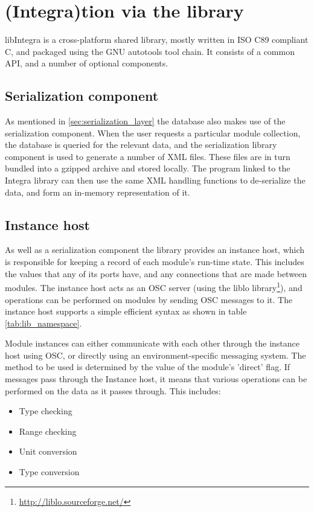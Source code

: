 \section{(Integra)tion via the library}\label{subsec:db_lib}

libIntegra is a cross-platform shared library, mostly written in ISO
C89 compliant C, and packaged using the GNU autotools tool chain. It
consists of a common API, and a number of optional components.

\subsection{Serialization component}\label{subsec:serialization}

As mentioned in \ref{sec:serialization_layer} the database also makes
use of the serialization component. When the user requests a
particular module collection, the database is queried for the relevant
data, and the serialization library component is used to generate a
number of XML files. These files are in turn bundled into a gzipped
archive and stored locally. The program linked to the Integra library
can then use the same XML handling functions to de-serialize the data,
and form an in-memory representation of it.

\subsection{Instance host}\label{subsec:instance_host}

As well as a serialization component the library provides an instance
host, which is responsible for keeping a record of each module's
run-time state. This includes the values that any of its ports have,
and any connections that are made between modules. The instance host
acts as an OSC server (using the liblo
library\footnote{\url{http://liblo.sourceforge.net/}}), and operations
can be performed on modules by sending OSC messages to it. The
instance host supports a simple efficient syntax as shown in table
\ref{tab:lib_namespace}.

Module instances can either communicate with each other through the
instance host using OSC, or directly using an environment-specific
messaging system. The method to be used is determined by the value of
the module's 'direct' flag. If messages pass through the Instance
host, it means that various operations can be performed on the data as
it passes through. This includes:
\begin{itemize}
\item Type checking
\item Range checking
\item Unit conversion
\item Type conversion
\end{itemize}


